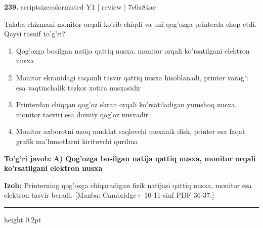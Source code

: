 \documentclass[10pt,a4paper]{article}
\begin{document}
{\bfseries\sffamily\color{ink} 239.} {scriptsizecolor{muted} Y1 | review | 7c0a84ae}
\par
Talaba chizmani monitor orqali ko'rib chiqdi va uni qog'ozga printerda chop etdi. Qaysi tasnif to'g'ri?
\begin{enumerate}[label=\Alph*),leftmargin=9mm]
\item Qog'ozga bosilgan natija qattiq nusxa, monitor orqali ko'rsatilgani elektron nusxa
\item Monitor ekranidagi raqamli tasvir qattiq nusxa hisoblanadi, printer varag'i esa vaqtinchalik tezkor xotira nusxasidir
\item Printerdan chiqqan qog'oz ekran orqali ko'rsatiladigan yumshoq nusxa, monitor tasviri esa doimiy qog'oz nusxadir
\item Monitor axborotni uzoq muddat saqlovchi mexanik disk, printer esa faqat grafik ma'lumotlarni kirituvchi qurilma
\end{enumerate}
\begin{tcolorbox}[enhanced,breakable,colback=teal!4,colframe=teal!60!black,boxrule=0.45pt,arc=1.2mm,left=2.7mm,right=2.7mm,top=1.8mm,bottom=1.8mm,before skip=2mm,after skip=2mm]
{\bfseries\sffamily\color{teal}To'g'ri javob:} \textbf{A) Qog'ozga bosilgan natija qattiq nusxa, monitor orqali ko'rsatilgani elektron nusxa}
\par\smallskip
{\bfseries Izoh:} Printerning qog'ozga chiqaradigan fizik natijasi qattiq nusxa, monitor esa elektron tasvir beradi. [Manba: Cambridge+ 10-11-sinf PDF 36-37.]
\end{tcolorbox}
\vspace{2mm}\hrule height 0.2pt\vspace{3mm}
\end{document}
